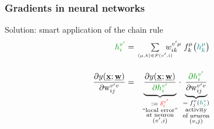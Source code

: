 \begin{frame} \frametitle{Gradients in neural networks} 

	\vspace{9mm}
	\begin{block}{Solution: smart application of the chain rule}
		\begin{eqnarray*}
			{\color{darkgreen}h_i^{v'}} 
	   			&=& \kern-2ex\smallsum{(\mu,k) \in P(v',i)}{} \kern-2ex
	   			w_{ik}^{v'\mu}\;  f_k^\mu\big( {\color{teal} h_k^\mu} \big)
	   		\\[4mm]
			\frac{\partial y(\vec{x}; \vec{w})}{\partial \mathrm{w}_{ij}^{v'v}}
				&=& \underbrace{\frac{\partial y(\vec{x}; \vec{w})}
					{{\color{darkgreen}\partial h_i^{v'}}} }_{ 
						\substack{\coloneqq\;{\color{red}\delta_i^{v'}} \\
						\text{``local error''} \\
						\text{at neuron} \\
						(v', i)}
					}
				  \cdot 
				  \underbrace{\frac{{\color{darkgreen}\partial h_i^{v'}}}
				  	{\partial \mathrm{w}_{ij}^{v'v}}}_{
						\substack{=\;f_j^v({\color{teal} h_j^v}) \\
						\text{activity} \\
						\text{of neuron} \\
						(v, j)}}
		\end{eqnarray*}
	\end{block}
\end{frame}

